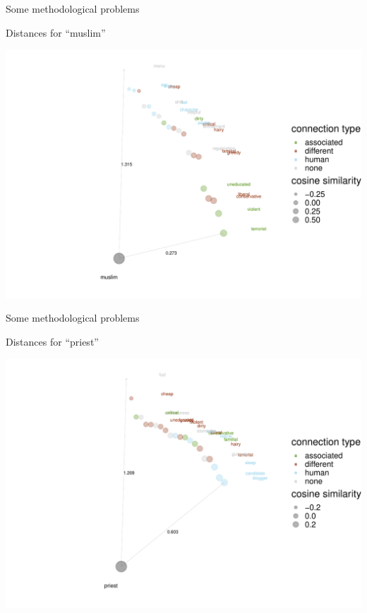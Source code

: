 \documentclass[
  10pt,
  ignorenonframetext,
  x11names, dvipsnames, bibspacing,natbib, table]{beamer}
\begin{document}
\begin{frame}{Some methodological problems}
\protect\hypertarget{some-methodological-problems-3}{}
\begin{block}{Distances for ``muslim''}
\protect\hypertarget{distances-for-muslim}{}
\begin{center}\includegraphics[width=0.8\linewidth]{presentationBoston_files/figure-beamer/unnamed-chunk-4-1} \end{center}
\end{block}
\end{frame}

\begin{frame}{Some methodological problems}
\protect\hypertarget{some-methodological-problems-4}{}
\begin{block}{Distances for ``priest''}
\protect\hypertarget{distances-for-priest}{}
\begin{center}\includegraphics[width=0.8\linewidth]{presentationBoston_files/figure-beamer/unnamed-chunk-5-1} \end{center}
\end{block}
\end{frame}
\end{document}
